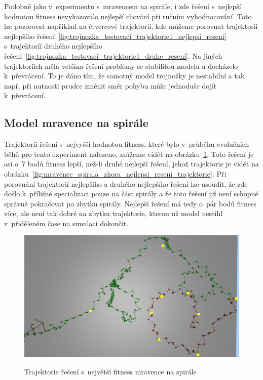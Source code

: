 Podobně jako v~experimentu s~mravencem na spirále, i zde řešení s~nejlepší hodnotou fitness nevykazovalo nejlepší chování při ručním vyhodnocování.
Toto lze pozorovat například na čtvercové trajektorii, kde můžeme porovnat trajektorii nejlepšího řešení~\ref{fig:trojnozka_testovaci_trajektorie1_nejlepsi_reseni} s~trajektoríí druhého nejlepšího řešení~\ref{fig:trojnozka_testovaci_trajektorie1_druhe_reseni}.
Na jiných trajektoriích měla vetšina řešení problémy se stabilitou modelu a docházelo k~převrácení.
To je dáno tím, že samotný model trojnožky je nestabilní a tak např. při nutnosti prudce změnit směr pohybu může jednoduše dojít k~převrácení.

\clearpage


\subsection{Model mravence na spirále}
\label{subsec:mravenec_spirala}

Trajektorii řešení s~nejvyšší hodnotou fitness, které bylo v~průběhu evolučních běhů pro tento experiment nalezeno, můžeme vidět na obrázku~\ref{fig:mravenec_spirala_zhora_nejlepsi_reseni_neoptimalni_trajektorie}.
Toto řešení je asi o~7 bodů fitness lepší, než-li druhé nejlepší řešení, jehož trajektorie je vidět na obrázku~\ref{fig:mravenec_spirala_zhora_nejlepsi_reseni_trajektorie}.
Při porovnání trajektorií nejlepšího a druhého nejlepšího řešení lze usoudit, že zde došlo k~přílišné specializaci pouze na část spirály a že toto řešení již není schopné správně pokračovat po zbytku spirály.
Nejlepší řešení má tedy o~pár bodů fitness více, ale není tak dobré na zbytku trajektorie, kterou už model nestihl v~přiděleném čase na simulaci dokončit.

\begin{figure}[h]
    \centering
    {\includegraphics[width=\linewidth]{obrazky/mravenec_spirala_zhora_nejlepsi_reseni_neoptimalni_trajektorie.png}}
    \caption{
    Trajektorie řešení s~největší fitness mravence na spirále
    }
    \label{fig:mravenec_spirala_zhora_nejlepsi_reseni_neoptimalni_trajektorie}
\end{figure}


